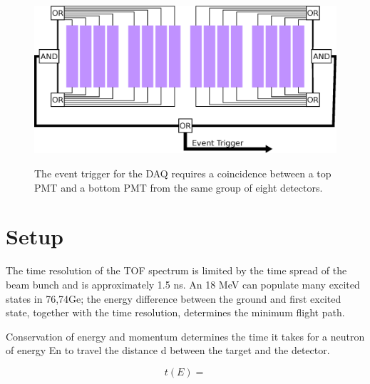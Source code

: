 \begin{figure}[htp]
\centering
\includegraphics[width=1.0\textwidth]{figures/event_trigger.eps}
\label{fig:eventTrig}
\caption{The event trigger for the DAQ requires a coincidence between a top PMT and a bottom PMT from the same group of eight detectors.}
\end{figure}


\section{Setup}

The time resolution of the TOF spectrum is limited by the time spread of the beam bunch and is approximately 1.5 ns.  An 18 MeV  can populate many excited states in 76,74Ge; the energy difference between the ground and first excited state, together with the time resolution, determines the minimum flight path.


Conservation of energy and momentum determines the time it takes for a neutron of energy En to travel the distance d between the target and the detector.

\begin{equation}
t(E) = 
\label{eq:TOF2}
\end{equation}


